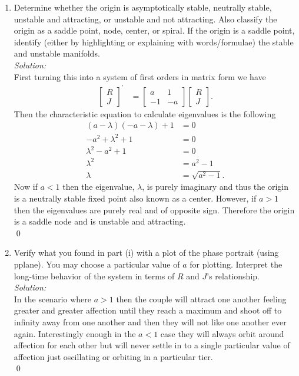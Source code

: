 \documentclass[10pt]{amsart}
\theoremstyle{nonumberplain}
\begin{document}
\begin{enumerate}[label={\bf {\arabic*}:}]
\begin{enumerate}
\begin{enumerate}
\item Determine whether the origin is asymptotically stable, neutrally stable, unstable and attracting, or unstable and not attracting.
Also classify the origin as a saddle point, node, center, or spiral.
If the origin is a saddle point, identify (either by highlighting or explaining with words/formulae) the stable and unstable manifolds. \\
\textit{Solution:} \\
First turning this into a system of first orders in matrix form we have
\begin{align*}
\begin{bmatrix}
R \\ J
\end{bmatrix}^\prime
&= \begin{bmatrix}
a & 1 \\
-1 & -a
\end{bmatrix} \begin{bmatrix}
R \\ J
\end{bmatrix}.
\end{align*}
Then the characteristic equation to calculate eigenvalues is the following
\begin{align*}
(a - \lambda)(-a - \lambda) + 1 &= 0 \\
-a^2 + \lambda^2 + 1 &= 0 \\
\lambda^2 - a^2 + 1 &= 0 \\
\lambda^2 &= a^2 - 1 \\
\lambda &= \sqrt{a^2 - 1}.
\end{align*}
Now if $a < 1$ then the eigenvalue, $\lambda$, is purely imaginary and thus the origin is a neutrally stable fixed point also known as a center.
However, if $a > 1$ then the eigenvalues are purely real and of opposite sign.
Therefore the origin is a saddle node and is unstable and attracting. \\
\qed \\

\item Verify what you found in part (i) with a plot of the phase portrait (using pplane).
You may choose a particular value of $a$ for plotting.
Interpret the long-time behavior of the system in terms of $R$ and $J$’s relationship. \\
\textit{Solution:} \\
In the scenario where $a > 1$ then the couple will attract one another feeling greater and greater affection until they reach a maximum and shoot off to infinity away from one another and then they will not like one another ever again.
Interestingly enough in the $a < 1$ case they will always orbit around affection for each other but will never settle in to a single particular value of affection just oscillating or orbiting in a particular tier. \\
\qed \\


\end{enumerate}
\end{enumerate}
\end{enumerate}
\end{document}

